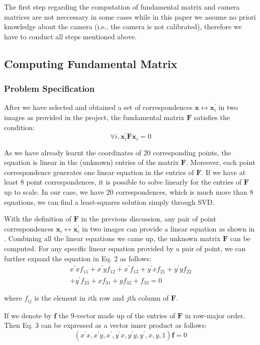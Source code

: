 \documentclass[conference]{IEEEtran}
\newcommand{\mat}[1]{\mathbf{#1}} %
\begin{document}
The first step regarding the computation of fundamental matrix and camera matrices are not neccessary in some cases while in this paper we assume no priori knowledge about the camera (i.e., the camera is not calibrated), therefore we have to conduct all steps mentioned above.

\subsection{Computing Fundamental Matrix}
\subsubsection{Problem Specification}
After we have selected and obtained a set of correspondences $\mat{x}\leftrightarrow \mat{x}_i^\prime$ in two images as provided in the project, the fundamental matrix $\mat{F}$ satisfies the condition:
\begin{equation}
	\forall i, \mat{x}_i^\prime \mat{F}\mat{x}_i = 0
\end{equation}

As we have already learnt the coordinates of 20 corresponding points, the equation is linear in the (unknown) entries of the matrix $\mat{F}$. Moreover, each point correspondence generates one linear equation in the entries of $\mat{F}$. If we have at least 8 point correspondences, it is possible to solve linearly for the entries of $\mat{F}$ up to scale. In our case, we have 20 correspondences, which is much more than 8 equations, we can find a least-squares solution simply through SVD.

With the definition of $\mat{F}$ in the previous discussion, any pair of point correspondences $\mat{x}_i\leftrightarrow \mat{x}_i^\prime$ in two images can provide a linear equation as shown in . Combining all the linear equations we came up, the unknown matrix $\mat{F}$ can be computed. For any specific linear equation provided by a pair of point, we can further expand the equation in Eq. 2 as follows:
\begin{multline}
	x^\prime xf_{11} + x^\prime yf_{12} + x^\prime f_{13} + y^\prime xf_{21} + y^\prime yf_{22}\\
	 + y^\prime f_{23} + xf_{31} + yf_{32} + f_{33} = 0
\end{multline}

\noindent where $f_{ij}$ is the element in $i$th row and $j$th column of $\mat{F}$.

If we denote by $\mat{f}$ the 9-vector made up of the entries of $\mat{F}$ in row-major order. Then 
Eq. 3 can be expressed as a vector inner product as follows:
\begin{equation}
	(x^\prime x, x^\prime y, x^\prime, y^\prime x, y^\prime y, y^\prime, x, y, 1)\mat{f} = 0
\end{equation}
\end{document}
